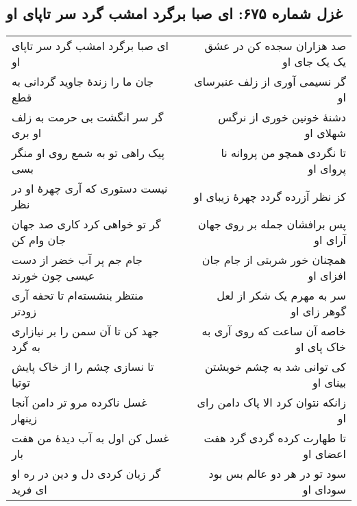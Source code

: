 \begin{center}
\section*{غزل شماره ۶۷۵: ای صبا برگرد امشب گرد سر تاپای او}
\label{sec:675}
\begin{longtable}{l p{0.5cm} r}
ای صبا برگرد امشب گرد سر تاپای او
&&
صد هزاران سجده کن در عشق یک یک جای او
\\
جان ما را زندهٔ جاوید گردانی به قطع
&&
گر نسیمی آوری از زلف عنبرسای او
\\
گر سر انگشت بی حرمت به زلف او بری
&&
دشنهٔ خونین خوری از نرگس شهلای او
\\
پیک راهی تو به شمع روی او منگر بسی
&&
تا نگردی همچو من پروانه نا پروای او
\\
نیست دستوری که آری چهرهٔ او در نظر
&&
کز نظر آزرده گردد چهرهٔ زیبای او
\\
گر تو خواهی کرد کاری صد جهان جان وام کن
&&
پس برافشان جمله بر روی جهان آرای او
\\
جام جم پر آب خضر از دست عیسی چون خورند
&&
همچنان خور شربتی از جام جان افزای او
\\
منتظر بنشسته‌ام تا تحفه آری زودتر
&&
سر به مهرم یک شکر از لعل گوهر زای او
\\
جهد کن تا آن سمن را بر نیازاری به گرد
&&
خاصه آن ساعت که روی آری به خاک پای او
\\
تا نسازی چشم را از خاک پایش توتیا
&&
کی توانی شد به چشم خویشتن بینای او
\\
غسل ناکرده مرو تر دامن آنجا زینهار
&&
زانکه نتوان کرد الا پاک دامن رای او
\\
غسل کن اول به آب دیدهٔ من هفت بار
&&
تا طهارت کرده گردی گرد هفت اعضای او
\\
گر زیان کردی دل و دین در ره او ای فرید
&&
سود تو در هر دو عالم بس بود سودای او
\\
\end{longtable}
\end{center}
